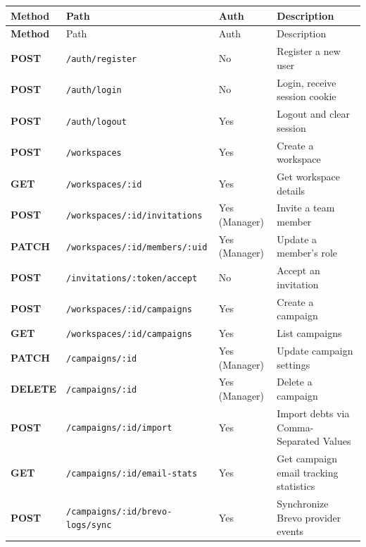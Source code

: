 \documentclass[12pt,a4paper]{report}
\begin{document}
{\footnotesize
\begin{longtable}{|>{\bfseries}p{1.3cm}|p{5.6cm}|p{2.4cm}|Y|}
  \hline
  Method & Path & Auth & Description \\
  \hline
  \endfirsthead
  \hline
  Method & Path & Auth & Description \\
  \hline
  \endhead
  POST  & \texttt{/auth/register}                    & No             & Register a new user \\
  \hline
  POST  & \texttt{/auth/login}                       & No             & Login, receive session cookie \\
  \hline
  POST  & \texttt{/auth/logout}                      & Yes            & Logout and clear session \\
  \hline
  POST  & \texttt{/workspaces}                       & Yes            & Create a workspace \\
  \hline
  GET   & \texttt{/workspaces/:id}                   & Yes            & Get workspace details \\
  \hline
  POST  & \texttt{/workspaces/:id/invitations}       & Yes (Manager)  & Invite a team member \\
  \hline
  PATCH & \texttt{/workspaces/:id/members/:uid}      & Yes (Manager)  & Update a member's role \\
  \hline
  POST  & \texttt{/invitations/:token/accept}        & No             & Accept an invitation \\
  \hline
  POST  & \texttt{/workspaces/:id/campaigns}         & Yes            & Create a campaign \\
  \hline
  GET   & \texttt{/workspaces/:id/campaigns}         & Yes            & List campaigns \\
  \hline
  PATCH & \texttt{/campaigns/:id}                    & Yes (Manager)  & Update campaign settings \\
  \hline
  DELETE & \texttt{/campaigns/:id}                   & Yes (Manager)  & Delete a campaign \\
  \hline
  POST  & \texttt{/campaigns/:id/import}             & Yes            & Import debts via Comma-Separated Values \\
  \hline
  GET   & \texttt{/campaigns/:id/email-stats}        & Yes            & Get campaign email tracking statistics \\
  \hline
  POST  & \texttt{/campaigns/:id/brevo-logs/sync}    & Yes            & Synchronize Brevo provider events \\

\end{longtable}}
\end{document}
